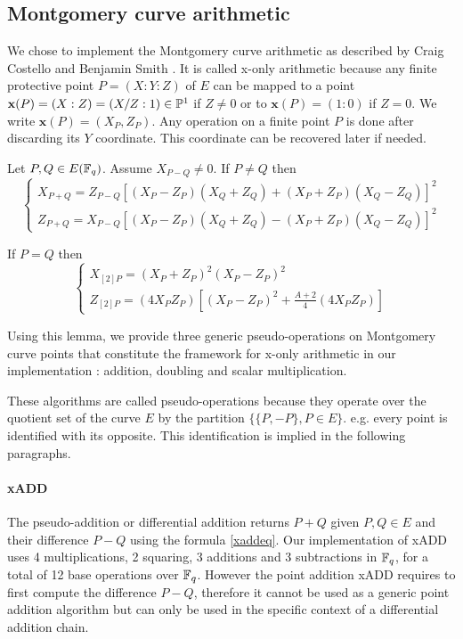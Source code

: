 \documentclass[../main.tex]{subfilesubs}
\begin{document}
\subsection{Montgomery curve arithmetic}

\newcommand{\x}{\textbf{x}}
\newcommand{\funct}[1]{\texttt{\detokenize{#1}}}
We chose to implement  the Montgomery curve arithmetic as described by Craig Costello and Benjamin Smith \cite{}.
It is called x-only arithmetic because any finite protective point $P = (X:Y:Z)$ of $E$ can be mapped to a point $\x(P)=(X:Z)=(X/Z:1)\in\PP^1$ if $Z\neq0$ or to $\x(P)=(1:0)$ if $Z=0$. We write $\x(P)=(X_P, Z_P)$.
Any operation on a finite point $P$ is done after discarding its $Y$ coordinate. This coordinate can be recovered later if needed.

\begin{lemma}Let $P,Q\in E(\mathbb{F}_q)$.  Assume $X_{P-Q}\neq0$.
	 If $P\neq Q$ then  \begin{equation}\label{xaddeq}\left\{\begin{array}{l}
	 	X_{P+Q} = Z_{P-Q}[(X_P-Z_P)(X_Q+Z_Q) + (X_P+Z_P)(X_Q-Z_Q)]^2\\
	 	Z_{P+Q} = X_{P-Q}[(X_P-Z_P)(X_Q+Z_Q) - (X_P+Z_P)(X_Q-Z_Q)]^2
	 \end{array}\right.\end{equation}

 	If $P=Q$ then \begin{equation}\label{xdbleq}\left\{\begin{array}{l}
 		X_{[2]P}=(X_P + Z_P)^2(X_P - Z_P)^2 \\
 		Z_{[2]P}=(4 X_P Z_P)[(X_P - Z_P)^2 + \frac{A+2}{4}(4 X_P Z_P)]
 	\end{array}\right.\end{equation}
\end{lemma}

Using this lemma, we provide three generic pseudo-operations on Montgomery curve points that constitute the framework for x-only arithmetic in our implementation : addition, doubling and scalar multiplication.

These algorithms are called pseudo-operations because they operate over the quotient set of the curve $E$ by the partition
$\lbrace\lbrace P, -P\rbrace, P\in E\rbrace$. e.g. every point is identified with its opposite. This identification is implied in the following paragraphs.

\paragraph{xADD}The pseudo-addition or differential addition \funct{MG_xADD} returns $P+Q$ given $P,Q\in E$ and their difference $P-Q$ using the formula \eqref{xaddeq}.
Our implementation of xADD uses 4 multiplications, 2 squaring,  3 additions and 3 subtractions in $\mathbb{F}_q$, for a total of  12 base operations over $\mathbb{F}_q$.
However the point addition xADD requires to first compute the difference $P-Q$, therefore it cannot be used as a generic point addition algorithm but can only be used in the specific context of a differential addition chain.
\end{document}
